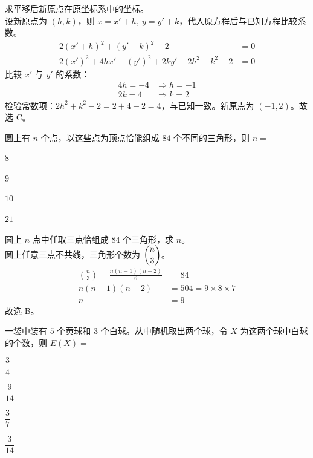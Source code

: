 \begin{solution}
    求平移后新原点在原坐标系中的坐标。\\
    设新原点为 $(h,k)$，则 $x=x'+h,\ y=y'+k$，代入原方程后与已知方程比较系数。\\
    \begin{align*}
        2(x'+h)^2+(y'+k)^2-2 &=0 \\
        2(x')^2+4hx'+(y')^2+2ky'+2h^2+k^2-2 &=0
    \end{align*}
    比较 $x'$ 与 $y'$ 的系数：
    \begin{align*}
        4h=-4 &\Rightarrow h=-1 \\
        2k=4 &\Rightarrow k=2
    \end{align*}
    检验常数项：$2h^2+k^2-2=2+4-2=4$，与已知一致。新原点为 $(-1,2)$。故选 C。
\end{solution}

\begin{question}
    圆上有 $n$ 个点，以这些点为顶点恰能组成 $84$ 个不同的三角形，则 $n=$ \paren[B]
    \begin{choices}
        \item $8$
        \item $9$
        \item $10$
        \item $21$
    \end{choices}
\end{question}

\begin{solution}
    圆上 $n$ 点中任取三点恰组成 $84$ 个三角形，求 $n$。\\
    圆上任意三点不共线，三角形个数为 $\dbinom{n}{3}$。\\
    \begin{align*}
        \binom{n}{3}=\frac{n(n-1)(n-2)}{6} &=84 \\
        n(n-1)(n-2) &=504=9\times8\times7 \\
        n &=9
    \end{align*}
    故选 B。
\end{solution}

\begin{question}
    一袋中装有 $5$ 个黄球和 $3$ 个白球。从中随机取出两个球，令 $X$ 为这两个球中白球的个数，则 $E(X)=$ \paren[A]
    \begin{choices}
        \item $\dfrac{3}{4}$
        \item $\dfrac{9}{14}$
        \item $\dfrac{3}{7}$
        \item $\dfrac{3}{14}$
    \end{choices}
\end{question}

